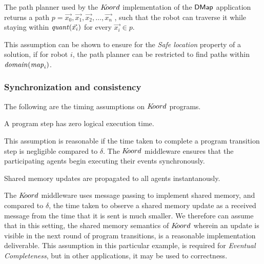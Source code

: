 \begin{assumption}
    The path planner used by the $K\kern-2pt oord$ implementation of the ${\sf DMap}$ application returns a path $p = \Vec{x_0},\Vec{x_1}, \Vec{x_2},\ldots, \Vec{x_n}$ , such that the robot can traverse it while staying within $\mathit{quant}(\Vec{x_i})$ for every $\Vec{x_i}\in p$.
\end{assumption}

This assumption can be shown to ensure for the \emph{Safe location} property of a solution, if for robot $i$, the path planner can be restricted to find paths within $\mathit{domain}(\mathit{map}_i)$.




\subsubsection{Synchronization and consistency}
The following are the timing assumptions on $K\kern-2pt oord$ programs.
\begin{assumption} A program step has zero logical execution time.
\end{assumption}
This assumption is reasonable if the time taken to complete a program transition step is negligible compared to $\delta$.  The $K\kern-2pt oord$ middleware ensures that the participating agents begin executing their events synchronously.

\begin{assumption} Shared memory updates are propagated to all agents instantanously.
\end{assumption}
The $K\kern-2pt oord$ middleware uses message passing to implement shared memory, and compared to $\delta$, the time taken to observe a shared memory update as a received message from the time that it is sent is much smaller. We therefore can assume that in this setting, the shared memory semantics of $K\kern-2pt oord$ wherein an update is visible in the next round of program transitions, is a reasonable implementation deliverable. This assumption in this particular example, is required for \emph{Eventual Completeness}, but in other applications, it may be used to correctness.



